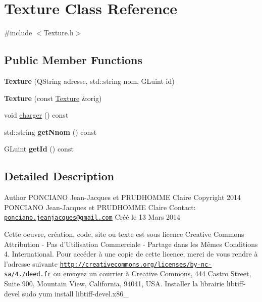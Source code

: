 \hypertarget{classTexture}{\section{Texture Class Reference}
\label{classTexture}
}


{\ttfamily \#include $<$Texture.\-h$>$}

\subsection*{Public Member Functions}
\begin{DoxyCompactItemize}
\item 
\hypertarget{classTexture_a6536fdc1838f905e0319ca7c88e3e58d}{{\bfseries Texture} (Q\-String adresse, std\-::string nom, G\-Luint id)}\label{classTexture_a6536fdc1838f905e0319ca7c88e3e58d}

\item 
\hypertarget{classTexture_abcac6b67c53983ee9e9a99373fe4c925}{{\bfseries Texture} (const \hyperlink{classTexture}{Texture} \&orig)}\label{classTexture_abcac6b67c53983ee9e9a99373fe4c925}

\item 
void \hyperlink{classTexture_a70b86ee52585f20c73e51cf03bb6f6c0}{charger} () const 
\item 
\hypertarget{classTexture_ac795255cc4811d4d57327bd9fecdaef9}{std\-::string {\bfseries get\-Nnom} () const }\label{classTexture_ac795255cc4811d4d57327bd9fecdaef9}

\item 
\hypertarget{classTexture_aa20db484528f539a9557a3193f2a08fb}{G\-Luint {\bfseries get\-Id} () const }\label{classTexture_aa20db484528f539a9557a3193f2a08fb}

\end{DoxyCompactItemize}


\subsection{Detailed Description}
\begin{DoxyAuthor}{Author}
P\-O\-N\-C\-I\-A\-N\-O Jean-\/\-Jacques et P\-R\-U\-D\-H\-O\-M\-M\-E Claire Copyright 2014 P\-O\-N\-C\-I\-A\-N\-O Jean-\/\-Jacques et P\-R\-U\-D\-H\-O\-M\-M\-E Claire Contact\-: \href{mailto:ponciano.jeanjacques@gmail.com}{\tt ponciano.\-jeanjacques@gmail.\-com} Créé le 13 Mars 2014
\end{DoxyAuthor}
Cette oeuvre, création, code, site ou texte est sous licence Creative Commons Attribution -\/ Pas d’\-Utilisation Commerciale -\/ Partage dans les Mêmes Conditions 4. International. Pour accéder à une copie de cette licence, merci de vous rendre à l'adresse suivante \href{http://creativecommons.org/licenses/by-nc-sa/4.0/deed.fr}{\tt http\-://creativecommons.\-org/licenses/by-\/nc-\/sa/4./deed.\-fr} ou envoyez un courrier à Creative Commons, 444 Castro Street, Suite 900, Mountain View, California, 94041, U\-S\-A. Installer la librairie libtiff-\/devel sudo yum install libtiff-\/devel.\-x86\-\_ 

